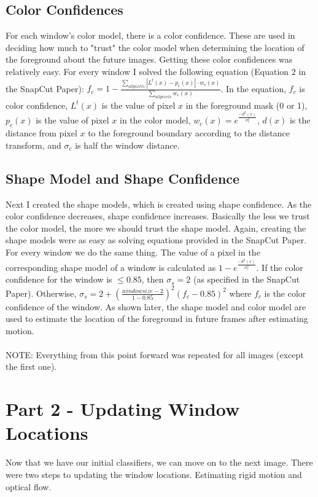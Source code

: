 \documentclass[10pt]{article}
\begin{document}
\subsection{Color Confidences}
For each window's color model, there is a color confidence. These are used in deciding how much to "trust" the color model when determining the location of the foreground about the future images. Getting these color confidences was relatively easy. For every window I solved the following equation (Equation 2 in the SnapCut Paper): $f_c = 1 - \frac{\sum_{all pixels} |L^t(x) - p_c(x)|\cdot w_c(x)}{\sum_{all pixels} w_c(x)}$. In the equation, $f_c$ is color confidence, $L^t(x)$ is the value of pixel $x$ in the foreground mask (0 or 1), $p_c(x)$ is the value of pixel $x$ in the color model, $w_c(x) = e^{\frac{-d^2(x)}{\sigma_c^2}}$, $d(x)$ is the distance from pixel $x$ to the foreground boundary according to the distance transform, and $\sigma_c$ is half the window distance.
\subsection{Shape Model and Shape Confidence}
Next I created the shape models, which is created using shape confidence. As the color confidence decreases, shape confidence increases. Basically the less we trust the color model, the more we should trust the shape model. Again, creating the shape models were as easy as solving equations provided in the SnapCut Paper. For every window we do the same thing. The value of a pixel in the corresponding shape model of a window is calculated as $1 - e^{\frac{-d^2(x)}{\sigma_s^2}}$. If the color confidence for the window is $\leq 0.85$, then $\sigma_s = 2$ (as specified in the SnapCut Paper). Otherwise, $\sigma_s = 2 + (\frac{windowsize - 2}{1 - 0.85})^2(f_c - 0.85)^2$ where $f_c$ is the color confidence of the window. As shown later, the shape model and color model are used to estimate the location of the foreground in future frames after estimating motion.
\\\\
NOTE: Everything from this point forward was repeated for all images (except the first one).
\section{Part 2 - Updating Window Locations}
Now that we have our initial classifiers, we can move on to the next image. There were two steps to updating the window locations. Estimating rigid motion and optical flow.
\end{document}
